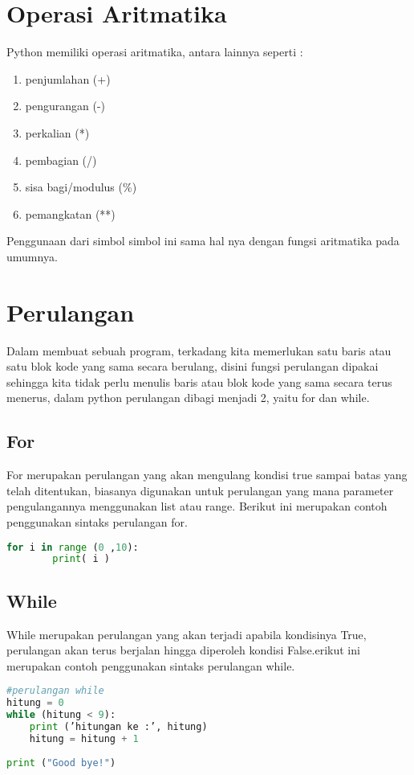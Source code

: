 \section{Operasi Aritmatika}
Python memiliki operasi aritmatika, antara lainnya seperti :
\begin{enumerate}
\item penjumlahan (+)
\item pengurangan (-)
\item perkalian (*)
\item pembagian (/)
\item sisa bagi/modulus (\%)
\item pemangkatan (**)
\end{enumerate}
Penggunaan dari simbol simbol ini sama hal nya dengan fungsi aritmatika pada umumnya.

\section{Perulangan}
Dalam membuat sebuah program, terkadang kita memerlukan satu baris atau satu blok kode yang sama secara berulang, disini fungsi perulangan dipakai sehingga kita tidak perlu menulis baris atau blok kode yang sama secara terus menerus, dalam python perulangan dibagi menjadi 2, yaitu for dan while.

\subsection{For}
For merupakan perulangan yang akan mengulang kondisi true sampai batas yang telah ditentukan,  biasanya digunakan untuk perulangan yang mana parameter pengulangannya menggunakan list atau range. Berikut ini merupakan contoh penggunakan sintaks perulangan for.
\begin{lstlisting}[language=Python]
for i in range (0 ,10): 
		print( i )
\end{lstlisting}

\subsection{While}
While merupakan perulangan yang akan terjadi apabila kondisinya True, perulangan akan terus berjalan hingga diperoleh kondisi False.erikut ini merupakan contoh penggunakan sintaks perulangan while.
\begin{lstlisting}[language=Python]
#perulangan while
hitung = 0 
while (hitung < 9): 
  	print (’hitungan ke :’, hitung) 
  	hitung = hitung + 1
 
print ("Good bye!")
\end{lstlisting}


